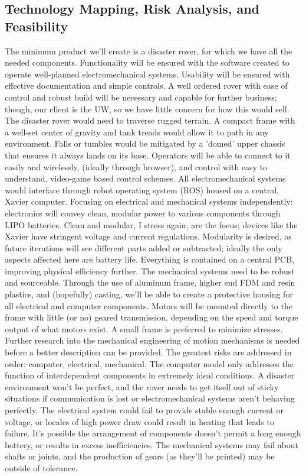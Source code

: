\documentclass[a4paper, 10pt]{article}
\begin{document}
	\subsection{Technology Mapping, Risk Analysis, and Feasibility}
	The minimum product we'll create is a disaster rover, for which we have all the needed components. Functionality will be ensured with the software created to operate well-planned electromechanical systems. Usability will be ensured with effective documentation and simple controls. A well ordered rover with ease of control and robust build will be necessary and capable for further business; though, our client is the UW, so we have little concern for how this would  sell.
	The disaster rover would need to traverse rugged terrain. A compact frame with a well-set center of gravity and tank treads would allow it to path in any environment. Falls or tumbles would be mitigated by a 'domed' upper chassis that ensures it always lands on its base. Operators will be able to connect to it easily and wirelessly, (ideally through browser), and control with easy to understand, video-game based control schemes. All electromechanical systems would interface through robot operating system (ROS) housed on a central, Xavier computer. Focusing on electrical and mechanical systems independently: electronics will convey clean, modular power to various components through LIPO batteries. Clean and modular, I stress again, are the focus; devices like the Xavier have stringent voltage and current regulations. Modularity is desired, as future iterations will see different parts added or subtracted; ideally the only aspects affected here are battery life. Everything is contained on a central PCB, improving physical efficiency further. The mechanical systems need to be robust and sourceable. Through the use of aluminum frame, higher end FDM and resin plastics, and (hopefully) casting, we'll be able to create a protective housing for all electrical and computer components. Motors will be mounted directly to the frame with little (or no) geared transmission, depending on the speed and torque output of what motors exist. A small frame is preferred to minimize stresses. Further research into the mechanical engineering of motion mechanisms is needed before a better description can be provided. 
	The greatest risks are addressed in order: computer, electrical, mechanical. The computer model only addresses the function of interdependent components in extremely ideal conditions. A disaster environment won't be perfect, and the rover needs to get itself out of sticky situations if communication is lost or electromechanical systems aren't behaving perfectly. The electrical system could fail to provide stable enough current or voltage, or locales of high power draw could result in heating that leads to failure. It's possible the arrangement of components doesn't permit a long enough battery, or results in excess inefficiencies. The mechanical systems may fail about shafts or joints, and the production of gears (as they'll be printed) may be outside of tolerance.
\end{document}
